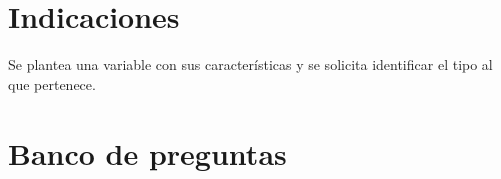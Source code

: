 \documentclass[a4,11pt]{aleph-notas}
\begin{document}
\encabezado

\vspace*{-8mm}
\section{Indicaciones}

Se plantea una variable con sus características y se solicita identificar el tipo al que pertenece.

\section{Banco de preguntas}
\end{document}
